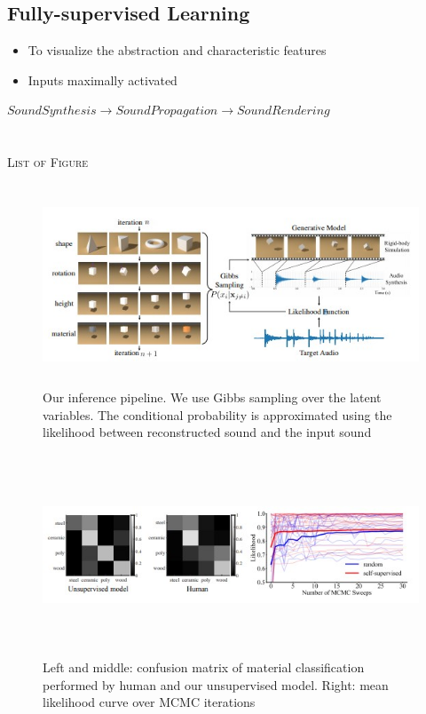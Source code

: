 \documentclass[12pt]{article}
\begin{document}
\subsection{Fully-supervised Learning}
\begin{itemize} 
\item To visualize the abstraction and characteristic features
\item Inputs maximally activated
\end{itemize}

$ Sound Synthesis \rightarrow Sound Propagation \rightarrow Sound Rendering $
\\
\\
\\
\textsc{\Large List of Figure }\\[0.5cm] 

\begin{figure}[H]
	\includegraphics[width=16cm, height=6cm]{fig1.jpg}
	\caption{Our inference pipeline. We use Gibbs sampling over the latent variables. The conditional
probability is approximated using the likelihood between reconstructed sound and the input sound}
	\label{fig:fig1} 	
\end{figure}

\begin{figure}[H]
	\includegraphics[width=16cm, height=6cm]{fig2.jpg}
	\caption{Left and middle: confusion matrix of material classification performed by human and our
unsupervised model. Right: mean likelihood curve over MCMC iterations}
	\label{fig:fig2} 	
\end{figure}
\end{document}
